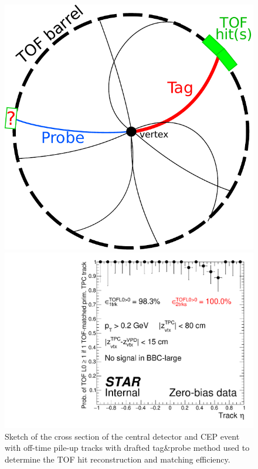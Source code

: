 \begin{figure}[b!]%
\centering%
\begin{minipage}{.4725\textwidth}%
  \centering%
  \includegraphics[width=0.98\linewidth]{graphics/correctionsToEff/TOF_tagAndProbe/sketch.pdf}%
  \caption[Sketch of the tag\&probe method.]%
  {Sketch of the cross section of the central detector and CEP event with off-time pile-up tracks with drafted tag\&probe method used to determine the TOF hit reconstruction and matching efficiency. }\label{fig:tagAndProbeSketch}
\end{minipage}%
\quad\quad%
\begin{minipage}{.4725\textwidth}%
  \centering%
  \includegraphics[width=\linewidth]{graphics/correctionsToEff/TOF_tagAndProbe/TofL0Eff_1TofVtx_1TofTrack.pdf}%

\end{minipage}
\end{figure}
